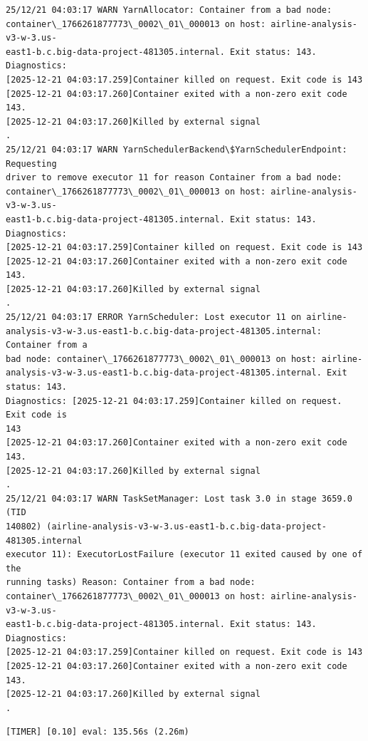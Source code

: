 \documentclass[11pt]{article}
\begin{document}
    \begin{Verbatim}[commandchars=\\\{\}]
25/12/21 04:03:17 WARN YarnAllocator: Container from a bad node:
container\_1766261877773\_0002\_01\_000013 on host: airline-analysis-v3-w-3.us-
east1-b.c.big-data-project-481305.internal. Exit status: 143. Diagnostics:
[2025-12-21 04:03:17.259]Container killed on request. Exit code is 143
[2025-12-21 04:03:17.260]Container exited with a non-zero exit code 143.
[2025-12-21 04:03:17.260]Killed by external signal
.
25/12/21 04:03:17 WARN YarnSchedulerBackend\$YarnSchedulerEndpoint: Requesting
driver to remove executor 11 for reason Container from a bad node:
container\_1766261877773\_0002\_01\_000013 on host: airline-analysis-v3-w-3.us-
east1-b.c.big-data-project-481305.internal. Exit status: 143. Diagnostics:
[2025-12-21 04:03:17.259]Container killed on request. Exit code is 143
[2025-12-21 04:03:17.260]Container exited with a non-zero exit code 143.
[2025-12-21 04:03:17.260]Killed by external signal
.
25/12/21 04:03:17 ERROR YarnScheduler: Lost executor 11 on airline-
analysis-v3-w-3.us-east1-b.c.big-data-project-481305.internal: Container from a
bad node: container\_1766261877773\_0002\_01\_000013 on host: airline-
analysis-v3-w-3.us-east1-b.c.big-data-project-481305.internal. Exit status: 143.
Diagnostics: [2025-12-21 04:03:17.259]Container killed on request. Exit code is
143
[2025-12-21 04:03:17.260]Container exited with a non-zero exit code 143.
[2025-12-21 04:03:17.260]Killed by external signal
.
25/12/21 04:03:17 WARN TaskSetManager: Lost task 3.0 in stage 3659.0 (TID
140802) (airline-analysis-v3-w-3.us-east1-b.c.big-data-project-481305.internal
executor 11): ExecutorLostFailure (executor 11 exited caused by one of the
running tasks) Reason: Container from a bad node:
container\_1766261877773\_0002\_01\_000013 on host: airline-analysis-v3-w-3.us-
east1-b.c.big-data-project-481305.internal. Exit status: 143. Diagnostics:
[2025-12-21 04:03:17.259]Container killed on request. Exit code is 143
[2025-12-21 04:03:17.260]Container exited with a non-zero exit code 143.
[2025-12-21 04:03:17.260]Killed by external signal
.
    \end{Verbatim}

    \begin{Verbatim}[commandchars=\\\{\}]
[TIMER] [0.10] eval: 135.56s (2.26m)
    \end{Verbatim}

    \begin{Verbatim}[commandchars=\\\{\}]

    \end{Verbatim}
\end{document}
